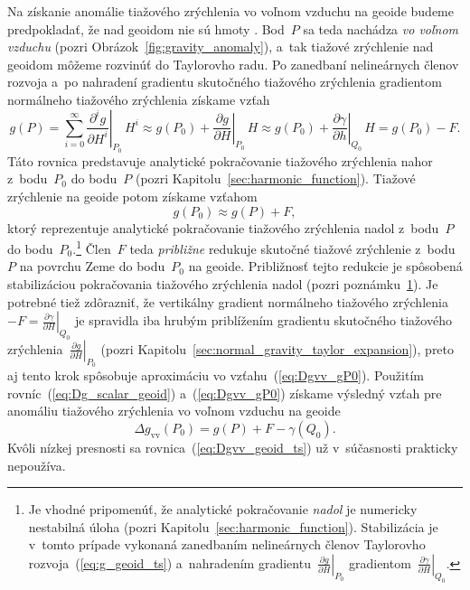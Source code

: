\documentclass[a4paper, 12pt]{book}
\begin{document}
Na získanie anomálie tiažového zrýchlenia vo voľnom vzduchu na geoide budeme 
predpokladať, že nad geoidom nie sú hmoty \parencite{MoritzPhysicalGeodesy}.  
Bod~$P$ sa teda nachádza \emph{vo voľnom vzduchu} (pozri 
Obrázok~\ref{fig:gravity_anomaly}), a~tak tiažové zrýchlenie nad geoidom môžeme 
rozvinúť do Taylorovho radu.  Po zanedbaní nelineárnych členov rozvoja a~po 
nahradení gradientu skutočného tiažového zrýchlenia gradientom normálneho 
tiažového zrýchlenia získame vzťah
%
\begin{equation}
\label{eq:g_geoid_ts}
g(P) = \sum_{i = 0}^{\infty} \left.\frac{\partial^i g}{\partial 
H^i}\right|_{P_0} \, H^i \approx g(P_0) + \left.\frac{\partial g}{\partial 
H}\right|_{P_0} \, H \approx g(P_0) + \left.\frac{\partial \gamma}{\partial 
h}\right|_{Q_0} \, H = g(P_0) - F{.}
\end{equation}
%
Táto rovnica predstavuje analytické pokračovanie tiažového zrýchlenia nahor 
z~bodu~$P_0$ do bodu~$P$ (pozri Kapitolu~\ref{sec:harmonic_function}).  Tiažové 
zrýchlenie na geoide potom získame vzťahom
%
\begin{equation}
\label{eq:Dgvv_gP0}
g(P_0) \approx g(P) + F{,}
\end{equation}
%
ktorý reprezentuje analytické pokračovanie tiažového zrýchlenia nadol 
z~bodu~$P$ do bodu~$P_0$.\footnote{\label{fn:Dgvv_P0_dc}Je vhodné pripomenúť, 
že analytické pokračovanie \emph{nadol} je numericky nestabilná úloha (pozri 
Kapitolu~\ref{sec:harmonic_function}).  Stabilizácia je v~tomto prípade 
vykonaná zanedbaním nelineárnych členov Taylorovho 
rozvoja~(\ref{eq:g_geoid_ts}) a~nahradením gradientu~$\left.\frac{\partial 
g}{\partial H}\right|_{P_0}$ gradientom~$\left.\frac{\partial \gamma}{\partial 
H}\right|_{Q_0}$.}  Člen~$F$ teda \emph{približne} redukuje skutočné tiažové 
zrýchlenie z~bodu~$P$ na povrchu Zeme do bodu~$P_0$ na geoide.  Približnosť 
tejto redukcie je spôsobená stabilizáciou pokračovania tiažového zrýchlenia 
nadol (pozri poznámku~\ref{fn:Dgvv_P0_dc}).  Je potrebné tiež zdôrazniť, že 
vertikálny gradient normálneho tiažového zrýchlenia~$-F = \left.\frac{\partial 
\gamma}{\partial H}\right|_{Q_0}$ je spravidla iba hrubým priblížením gradientu 
skutočného tiažového zrýchlenia~$\left.\frac{\partial g}{\partial 
H}\right|_{P_0}$ (pozri Kapitolu~\ref{sec:normal_gravity_taylor_expansion}), 
preto aj tento krok spôsobuje aproximáciu vo vzťahu~(\ref{eq:Dgvv_gP0}).  
Použitím rovníc~(\ref{eq:Dg_scalar_geoid}) a~(\ref{eq:Dgvv_gP0}) získame 
výsledný vzťah pre anomáliu tiažového zrýchlenia vo voľnom vzduchu na geoide
%
\begin{equation}
\label{eq:Dgvv_geoid_ts}
\Delta g_\mathrm{vv}(P_0) = g(P) + F - \gamma(Q_0){.}
\end{equation}
%
Kvôli nízkej presnosti sa rovnica~(\ref{eq:Dgvv_geoid_ts}) už v~súčasnosti 
prakticky nepoužíva.
\end{document}
